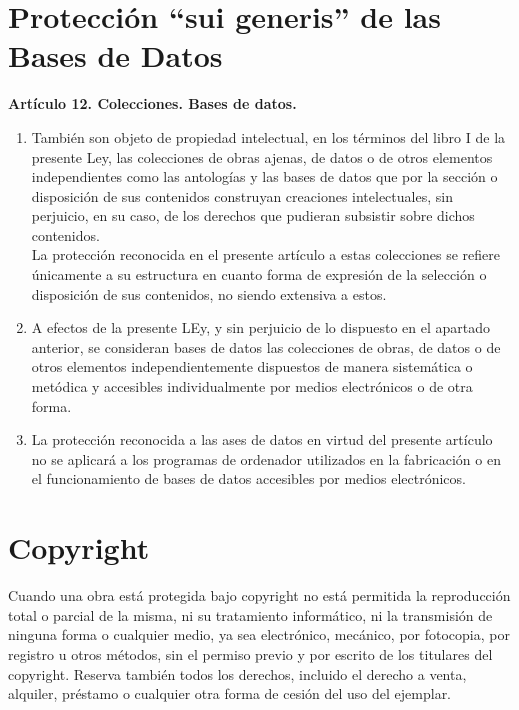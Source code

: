 \section{Protección ``sui generis'' de las Bases de Datos}

\textbf{Artículo 12. Colecciones. Bases de datos.}

\begin{enumerate}[label=\textbf{\arabic*.}]
    \item También son objeto de propiedad intelectual, en los términos del libro I de la presente Ley, las colecciones de obras ajenas, de datos o de otros elementos independientes como las antologías y las bases de datos que por la sección o disposición de sus contenidos construyan creaciones intelectuales, sin perjuicio, en su caso, de los derechos que pudieran subsistir sobre dichos contenidos.\\
          La protección reconocida en el presente artículo a estas colecciones se refiere únicamente a su estructura en cuanto forma de expresión de la selección o disposición de sus contenidos, no siendo extensiva a estos.
    \item A efectos de la presente LEy, y sin perjuicio de lo dispuesto en el apartado anterior, se consideran bases de datos las colecciones de obras, de datos o de otros elementos independientemente dispuestos de manera sistemática o metódica y accesibles individualmente por medios electrónicos o de otra forma.
    \item La protección reconocida a las ases de datos en virtud del presente artículo no se aplicará a los programas de ordenador utilizados en la fabricación o en el funcionamiento de bases de datos accesibles por medios electrónicos.
\end{enumerate}

\section{Copyright}

Cuando una obra está protegida bajo copyright no está permitida la reproducción total o parcial de la misma, ni su tratamiento informático, ni la transmisión de ninguna forma o cualquier medio, ya sea electrónico, mecánico, por fotocopia, por registro u otros métodos, sin el permiso previo y por escrito de los titulares del copyright. Reserva también todos los derechos, incluido el derecho a venta, alquiler, préstamo o cualquier otra forma de cesión del uso del ejemplar.


